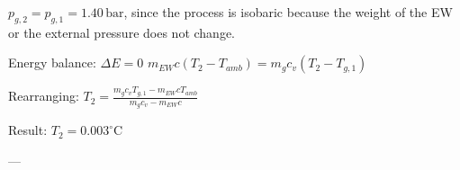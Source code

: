 \( p_{g,2} = p_{g,1} = 1.40 \, \text{bar} \), since the process is isobaric because the weight of the EW or the external pressure does not change.  

Energy balance:  
\( \Delta E = 0 \)  
\( m_{EW} c (T_2 - T_{amb}) = m_g c_v (T_2 - T_{g,1}) \)  

Rearranging:  
\( T_2 = \frac{m_g c_v T_{g,1} - m_{EW} c T_{amb}}{m_g c_v - m_{EW} c} \)  

Result:  
\( T_2 = 0.003^\circ \text{C} \)  

---